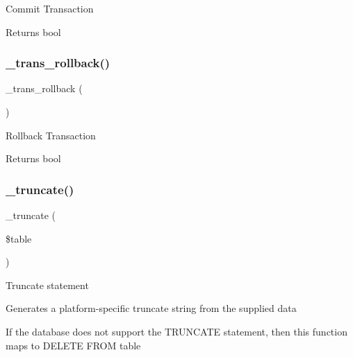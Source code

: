 Commit Transaction

\begin{DoxyReturn}{Returns}
bool 
\end{DoxyReturn}
\mbox{\label{class_c_i___d_b__sqlite__driver_ad49a116b0776c26b53114c9093fd102a}} 
\subsubsection{\texorpdfstring{\+\_\+trans\+\_\+rollback()}{\_trans\_rollback()}}
{\footnotesize\ttfamily \+\_\+trans\+\_\+rollback (\begin{DoxyParamCaption}{ }\end{DoxyParamCaption})\hspace{0.3cm}{\ttfamily [protected]}}

Rollback Transaction

\begin{DoxyReturn}{Returns}
bool 
\end{DoxyReturn}
\mbox{\label{class_c_i___d_b__sqlite__driver_aa029600528fc1ce660a23ff4b4667f95}} 
\subsubsection{\texorpdfstring{\+\_\+truncate()}{\_truncate()}}
{\footnotesize\ttfamily \+\_\+truncate (\begin{DoxyParamCaption}\item[{}]{\$table }\end{DoxyParamCaption})\hspace{0.3cm}{\ttfamily [protected]}}

Truncate statement

Generates a platform-\/specific truncate string from the supplied data

If the database does not support the T\+R\+U\+N\+C\+A\+TE statement, then this function maps to \textquotesingle{}D\+E\+L\+E\+TE F\+R\+OM table\textquotesingle{}


